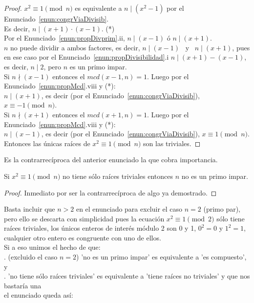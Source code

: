 \begin{proof}
$x^2 \equiv 1 \pmod n$ es equivalente a $n \mid (x^2-1)$ por el Enunciado~\ref{enun:congrViaDivisib}. \\
Es decir, $n \mid (x+1) \cdot (x-1)$.  \quad\quad (*) \\
Por el Enunciado~\ref{enun:propDivprim}.ii, $n \mid (x-1)$ ó $n \mid (x+1)$. \\
$n$ no puede dividir a ambos factores, es decir, $n \mid (x-1)$ \, y \, $n \mid (x+1)$, pues en ese caso por el Enunciado~\ref{enun:propDivisibilidad}.i $n \mid (x+1)-(x-1)$, es decir, $n \mid 2$, pero $n$ es un primo impar. \\
Si $n  \nmid (x-1)$ entonces el $mcd(x-1,n)=1$. Luego por el Enunciado~\ref{enun:propMcd}.viii y (*): \\
$n \mid (x+1)$, es decir (por el Enunciado~\ref{enun:congrViaDivisib}), $x \equiv -1 \pmod n$. \\
Si $n  \nmid (x+1)$ entonces el $mcd(x+1,n)=1$. Luego por el Enunciado~\ref{enun:propMcd}.viii y (*): \\
$n \mid (x-1)$, es decir (por el Enunciado~\ref{enun:congrViaDivisib}), $x \equiv 1 \pmod n$. \\
Entonces las únicas raíces de $x^2 \equiv 1 \pmod n$ son las triviales.
\end{proof}

Es la contrarrecíproca del anterior enunciado la que cobra importancia.

\begin{enunciado} \label{enun:criterioRabin0}\leavevmode\par
Si $x^2 \equiv 1 \pmod n$ no tiene sólo raíces triviales entonces $n$ no es un primo impar.
\end{enunciado}

\begin{proof}
Inmediato por ser la contrarrecíproca de algo ya demostrado.
\end{proof}

Basta incluir que $n>2$ en el enunciado para excluir el caso $n=2$ (primo par), pero ello se descarta con simplicidad pues la ecuación $x^2 \equiv 1 \pmod 2$ sólo tiene raíces triviales, los únicos enteros de interés módulo 2 son 0 y 1, $0^2=0$ y $1^2=1$, cualquier otro entero es congruente con uno de ellos. \\
Si a eso unimos el hecho de que: \\
. (excluido el caso $n=2$) 'no es un primo impar' es equivalente a 'es compuesto', y \\
. 'no tiene sólo raíces triviales' es equivalente a 'tiene raíces no triviales' y que nos bastaría una \\
el enunciado queda así:

